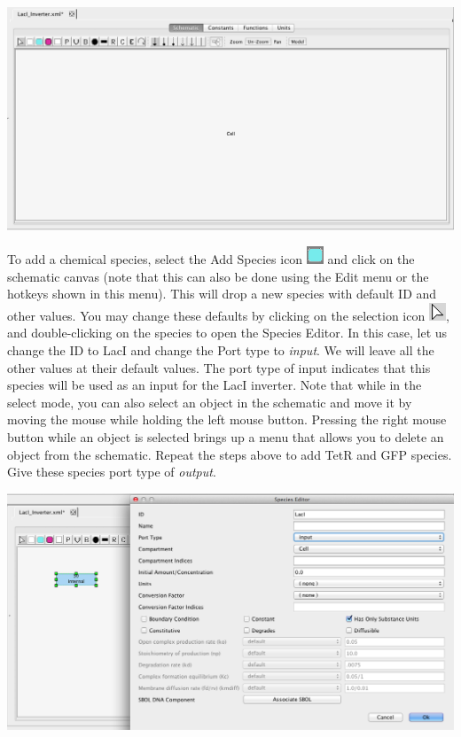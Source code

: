 \documentclass[titlepage,11pt]{article}
\begin{document}
\begin{center}
\includegraphics[width=160mm]{screenshots/schematicGT}
\end{center}

To add a chemical species, select the Add Species icon \includegraphics{../gui/icons/modelview/add_species_selected} and click on the schematic canvas  (note that this can also be done using the Edit menu or the hotkeys shown in this menu).  This will drop a new species with default ID and other values.  You may change these defaults by clicking on the selection icon 
\includegraphics{../gui/icons/modelview/select_mode_selected}, and
double-clicking on the species to open the Species Editor.  In this case, let us change the ID to LacI and change the Port type to \emph{input}.  We will leave all the other values at their default values.  The port type of input indicates that this species will be used as an input for the LacI inverter.   
Note that while in the select mode, you can also select an object in the schematic and move it by moving the mouse while holding the left mouse button.  Pressing the right mouse button while an object is selected brings up a menu that allows you to delete an object from the schematic.  Repeat the steps above to add TetR and GFP species.  Give these species port type of \emph{output}. 

\begin{center}
\includegraphics[width=160mm]{screenshots/speciesGT}
\end{center}
\end{document}
